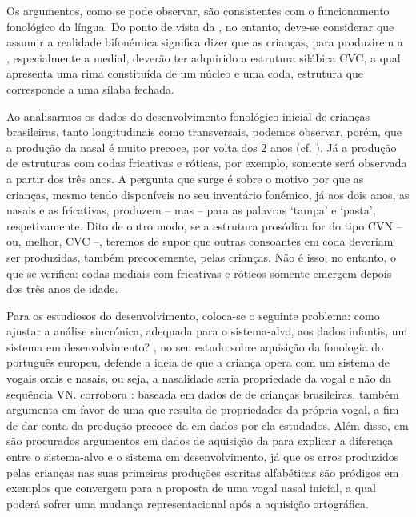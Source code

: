 \documentclass[output=paper]{LSP/langsci}
\begin{document}
Os argumentos, como se pode observar, são consistentes com o funcionamento fonológico da língua. Do ponto de vista da , no entanto, deve-se considerar que assumir a realidade bifonémica significa dizer que as crianças, para produzirem a , especialmente a medial, deverão ter adquirido a estrutura silábica CVC, a qual apresenta uma rima constituída de um núcleo e uma coda, estrutura que corresponde a uma sílaba fechada.

Ao analisarmos os dados do desenvolvimento fonológico inicial de crianças brasileiras, tanto longitudinais como transversais, podemos observar, porém, que a produção da nasal é muito precoce, por volta dos 2 anos (cf. \citealt{matzenauer1990,miranda2009}). Já a produção de estruturas com codas fricativas e róticas, por exemplo, somente será observada a partir dos três anos. A pergunta que surge é sobre o motivo por que as crianças, mesmo tendo disponíveis no seu inventário fonémico, já aos dois anos, as nasais e as fricativas, produzem \textipa{[\textprimstress t\~am.pa]} -- mas \textipa{[\textprimstress pa.ta]} -- para as palavras `tampa' e `pasta', respetivamente. Dito de outro modo, se a estrutura prosódica for do tipo CVN -- ou, melhor, CVC --, teremos de supor que outras consoantes em coda deveriam ser produzidas, também precocemente, pelas crianças. Não é isso, no entanto, o que se verifica: codas mediais com fricativas e róticos somente emergem depois dos três anos de idade. 

Para os estudiosos do desenvolvimento, coloca-se o seguinte problema: como ajustar a análise sincrónica, adequada para o sistema-alvo, aos dados infantis, um sistema em desenvolvimento? \citet{freitas1997}, no seu estudo sobre aquisição da fonologia do português europeu, defende a ideia de que a criança opera com um sistema de vogais orais e nasais, ou seja, a nasalidade seria propriedade da vogal e não da sequência VN. \citet{miranda2009} corrobora \citet{freitas1997}: baseada em dados de  de crianças brasileiras, também argumenta em favor de uma  que resulta de propriedades da própria vogal, a fim de dar conta da produção precoce da  em dados por ela estudados. Além disso, em \citet{miranda2009} são procurados argumentos em dados de aquisição da  para explicar a diferença entre o sistema-alvo e o sistema em desenvolvimento, já que os erros produzidos pelas crianças nas suas primeiras produções escritas alfabéticas são pródigos em exemplos que convergem para a proposta de uma vogal nasal inicial, a qual poderá sofrer uma mudança representacional após a aquisição ortográfica.
\end{document}
